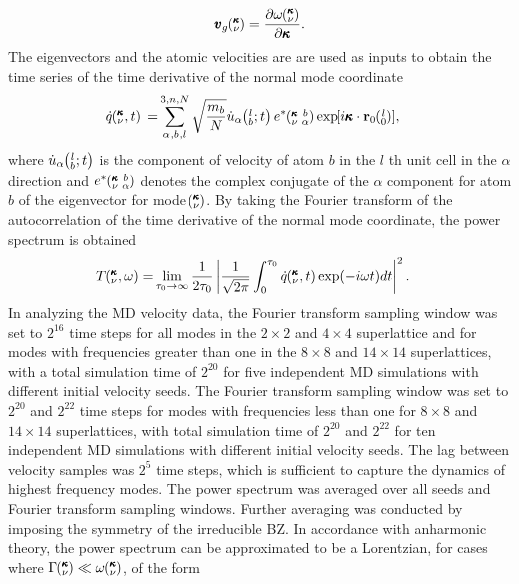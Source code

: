 \documentclass[aps,prb,preprint,preprintnumbers,amsmath,amssymb,floatfix,superscriptaddress]{revtex4}
\newcommand{\EXP}[1]{\exp\mspace{-5.0mu}\left[#1\right]\mspace{-3.0mu}}
\newcommand{\SUM}[2]{\ifthenelse{\equal{#1}{0}}{\sum_{
\alpha_{#2},b_{#2},l_{#2}}^{3,n,N}} {\ifthenelse{\equal{#1}{1}}{\sum_{
\alpha_{#2},b_{#2}}^{3,n}}{\sum_{\pmb{\kappa}#2,\nu#2}^{N,3n}}}}
\newcommand{\ab}[2]{\mspace{-4.0mu}\left(\mspace{-8.0mu}
\begin{smallmatrix}&\ifthenelse{\equal{#1}{}}{a}{#1} \\&\ifthenelse
{\equal{#2}{}}{b}{#2}\end{smallmatrix}\mspace{-3.0mu}\right)}
\newcommand{\kvba}{\mspace{-4.0mu}\left(\mspace{-8.0mu}
\begin{smallmatrix} &\pmb{\kappa} &b \\ &\nu &\alpha\end{smallmatrix}
\mspace{-3.0mu}\right)}
\newcommand{\kvt}{\mspace{-4.0mu}\left(\mspace{-8.0mu}
\begin{smallmatrix}&\pmb{\kappa} \\&\nu\end{smallmatrix}
\mspace{-2.0mu},t\right)}
\newcommand{\kvw}{\mspace{-4.0mu}\left(\mspace{-8.0mu}
\begin{smallmatrix}&\pmb{\kappa} \\&\nu\end{smallmatrix}
\mspace{-2.0mu},\omega\right)}
\newcommand{\kv}{\mspace{-4.0mu}\left(\mspace{-8.0mu}
\begin{smallmatrix}&\pmb{\kappa} \\&\nu\end{smallmatrix}
\mspace{-3.0mu}\right)}
\newcommand{\lbt}{\mspace{-4.0mu}\left(\mspace{-8.0mu}
\begin{smallmatrix}&l \\&b\end{smallmatrix}\mspace{-2.0mu};t\right)}
\begin{document}
\begin{equation}\label{EQ:NMD:vg}
\begin{split}
\pmb{v}_{g}\kv=\frac{\partial \omega \kv}{\partial \pmb{\kappa}}.
\end{split}
\end{equation}
The eigenvectors and the atomic velocities are are used as inputs to obtain the time series of the time derivative of the normal mode coordinate 
\begin{equation}\label{EQ:NMD:qdot}
\begin{split}
\dot{q}\kvt{}{}{}=&\SUM{0}{}\sqrt{\frac{m_b}{N}}\dot{u}_{\alpha}\lbt e^*\kvba\EXP{i\pmb{\kappa}\cdot\mathbf{r}_0\ab{l}{0}},
\end{split}
\end{equation}
where $\dot{u}_{\alpha}\lbt$ is the component of velocity of atom $b$ in the $l$ th unit cell in the $\alpha$ direction and $e^*\kvba$ denotes the complex conjugate of the $\alpha$ component for atom $b$ of the eigenvector for mode $\kv$. By taking the Fourier transform of the autocorrelation of the time derivative of the normal mode coordinate, the power spectrum is obtained \cite{dove_introduction_1993-3}
\begin{equation}\label{EQ:NMD:SED}
\begin{split}
T\kvw=&\lim_{\tau_0\rightarrow\infty}\frac{1}{2\tau_0}\left|\frac{1}{\sqrt{2\pi}}\int_{0}^{\tau_0}\dot{q}\kvt\exp(-i\omega t)dt\right|^2.
\end{split}
\end{equation}
In analyzing the MD velocity data, the Fourier transform sampling window was set to $2^{16}$ time steps for all modes in the $2 \times 2$ and $4 \times 4$ superlattice and for modes with frequencies greater than one in the $8\times 8$ and $14 \times 14$ superlattices, with a total simulation time of $2^{20}$ for five independent MD simulations with different initial velocity seeds. The Fourier transform sampling window was set to $2^{20}$ and $2^{22}$ time steps for modes with frequencies less than one for $8\times 8$ and $14 \times 14$ superlattices, with total simulation time of $2^{20}$ and $2^{22}$ for ten independent MD simulations with different initial velocity seeds. The lag between velocity samples was $2^5$ time steps, which is sufficient to capture the dynamics of highest frequency modes. The power spectrum was averaged over all seeds and Fourier transform sampling windows. Further averaging was conducted by imposing the symmetry of the irreducible BZ. In accordance with anharmonic theory,\cite{maradudin_scattering_1962} the power spectrum can be approximated to be a Lorentzian, for cases where $\Gamma\kv \ll \omega\kv$, of the form 
\end{document}
